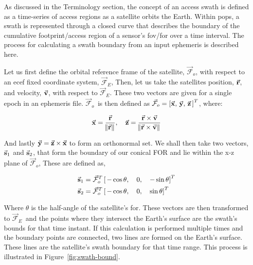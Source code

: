 As discussed in the Terminology section, the concept of an access swath is
defined as a time-series of access regions as a satellite orbits the Earth.
Within \gls{pops}, a swath is represented through a closed curve that describes
the boundary of the cumulative footprint/access region of a sensor’s
\gls{fov}/\gls{for} over a time interval. The process for calculating a swath
boundary from an input ephemeris is described here.  

\newcommand{\Fo}{$\vec{\mathcal{F}}_o$} 
\newcommand{\Fe}{$\vec{\mathcal{F}}_E$}

Let us first define the orbital reference frame of the satellite, \Fo, with
respect to an \gls{ecef} fixed coordinate system, \Fe,  Then, let us take the
satellites position, $\vec{\bm{\mathrm{r}}}$, and velocity, $\vec{\bm{\mathrm{v}}}$, with respect to \Fe.
These two vectors are given for a single epoch in an ephemeris file.  \Fo ~is
then defined as $ \vec{\mathcal{F}}_o = \left[ \vec{\bm{\mathrm{x}}}, \, \vec{\bm{\mathrm{y}}}, \, \vec{\bm{\mathrm{z}}}
\, \right]^T$, where:

\begin{equation} 
    \vec{\bm{\mathrm{x}}} = \frac{\vec{\bm{\mathrm{r}}}}{\norm{\vec{\bm{\mathrm{r}}}}}, 
    \quad 
    \vec{\bm{\mathrm{z}}} = \frac{\vec{\bm{\mathrm{r}}}\times\vec{\bm{\mathrm{v}}}}{\norm{\vec{\bm{\mathrm{r}}}\times\vec{\bm{\mathrm{v}}}}}
\end{equation}

And lastly $\vec{\bm{\mathrm{y}}} = \vec{\bm{\mathrm{z}}} \times \vec{\bm{\mathrm{x}}}$ to form an orthonormal set. We
shall then take two vectors, $\vec{\bm{\mathrm{s}}}_{1}$ and $\vec{\bm{\mathrm{s}}}_{2}$, that form the
boundary of our conical FOR and lie within the x-z plane of \Fo,  These are
defined as,

\begin{align}
    \vec{\bm{\mathrm{s}}}_{1} &= \vec{\mathcal{F}}_o^T \left[ \, -\cos\theta, \quad 0, \quad -\sin\theta \right]^T \\
    \vec{\bm{\mathrm{s}}}_{2} &= \vec{\mathcal{F}}_o^T \left[ \, -\cos\theta, \quad 0, \quad \sin\theta \right]^T
\end{align}

Where $\theta$ is the half-angle of the satellite’s \gls{for}. These vectors
are then transformed to \Fe~and the points where they intersect the Earth’s
surface are the swath’s bounds for that time instant. If this calculation is
performed multiple times and the boundary points are connected, two lines are
formed on the Earth’s surface. These lines are the satellite’s swath boundary
for that time range.  This process is illustrated in
Figure~\ref{fig:swath-bound}.

%

